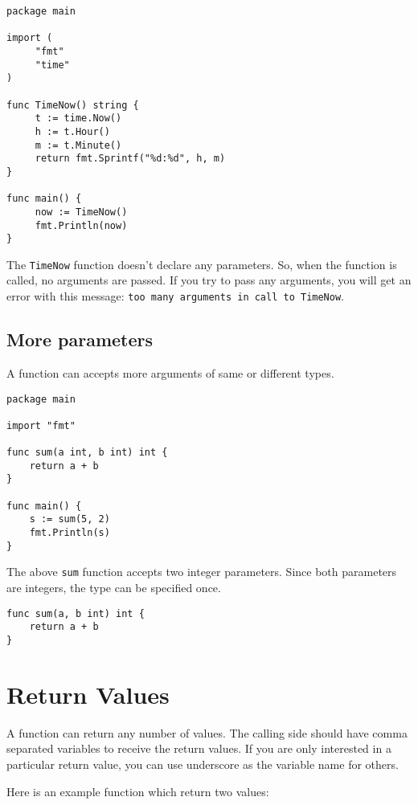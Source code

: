\begin{lstlisting}[caption=Function without any parameters]
package main

import (
     "fmt"
     "time"
)

func TimeNow() string {
     t := time.Now()
     h := t.Hour()
     m := t.Minute()
     return fmt.Sprintf("%d:%d", h, m)
}

func main() {
     now := TimeNow()
     fmt.Println(now)
}
\end{lstlisting}

The \texttt{TimeNow} function doesn't declare any parameters.  So,
when the function is called, no arguments are passed.  If you try to
pass any arguments, you will get an error with this
message: \texttt{too many arguments in call to TimeNow}.

\subsection{More parameters}

A function can accepts more arguments of same or different types.

\begin{lstlisting}[caption=Function with two parameters]
package main

import "fmt"

func sum(a int, b int) int {
    return a + b
}

func main() {
    s := sum(5, 2)
    fmt.Println(s)
}
\end{lstlisting}

The above \texttt{sum} function accepts two integer parameters.  Since
both parameters are integers, the type can be specified once.

\begin{lstlisting}[numbers=none]
func sum(a, b int) int {
    return a + b
}
\end{lstlisting}

\section{Return Values}

A function can return any number of values.  The calling
side should have comma separated variables to receive the return
values.  If you are only interested in a particular return value, you
can use underscore as the variable name for others.

Here is an example function which return two values:

